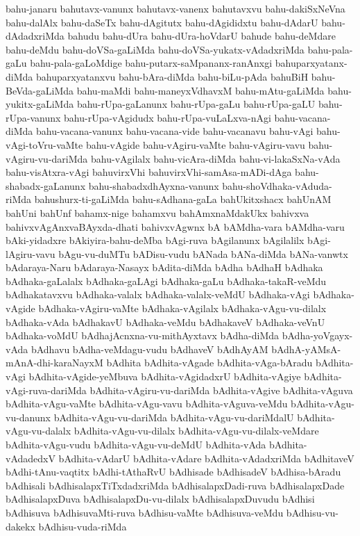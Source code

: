 {bahu-janaru
bahutavx-vanunx
bahutavx-vanenx
bahutavxvu
bahu-dakiSxNeVna
bahu-dalAlx
bahu-daSeTx
bahu-dAgitutx
bahu-dAgididxtu
bahu-dAdarU
bahu-dAdadxriMda
bahudu
bahu-dUra
bahu-dUra-hoVdarU
bahude
bahu-deMdare
bahu-deMdu
bahu-doVSa-gaLiMda
bahu-doVSa-yukatx-vAdadxriMda
bahu-pala-gaLu
bahu-pala-gaLoMdige
bahu-putarx-saMpananx-ranAnxgi
bahuparxyatanx-diMda
bahuparxyatanxvu
bahu-bAra-diMda
bahu-biLu-pAda
bahuBiH
bahu-BeVda-gaLiMda
bahu-maMdi
bahu-maneyxVdhavxM
bahu-mAtu-gaLiMda
bahu-yukitx-gaLiMda
bahu-rUpa-gaLanunx
bahu-rUpa-gaLu
bahu-rUpa-gaLU
bahu-rUpa-vanunx
bahu-rUpa-vAgidudx
bahu-rUpa-vuLaLxva-nAgi
bahu-vacana-diMda
bahu-vacana-vanunx
bahu-vacana-vide
bahu-vacanavu
bahu-vAgi
bahu-vAgi-toVru-vaMte
bahu-vAgide
bahu-vAgiru-vaMte
bahu-vAgiru-vavu
bahu-vAgiru-vu-dariMda
bahu-vAgilalx
bahu-vicAra-diMda
bahu-vi-lakaSxNa-vAda
bahu-visAtxra-vAgi
bahuvirxVhi
bahuvirxVhi-samAsa-mADi-dAga
bahu-shabadx-gaLanunx
bahu-shabadxdhAyxna-vanunx
bahu-shoVdhaka-vAduda-riMda
bahushurx-ti-gaLiMda
bahu-sAdhana-gaLa
bahUkitxshacx
bahUnAM
bahUni
bahUnf
bahamx-nige
bahamxvu
bahAmxnaMdakUkx
bahivxva
bahivxvAgAnxvaBAyxda-dhati
bahivxvAgwnx
bA
bAMdha-vara
bAMdha-varu
bAki-yidadxre
bAkiyira-bahu-deMba
bAgi-ruva
bAgilanunx
bAgilalilx
bAgi-lAgiru-vavu
bAgu-vu-duMTu
bADisu-vudu
bANada
bANa-diMda
bANa-vanwtx
bAdaraya-Naru
bAdaraya-Nasayx
bAdita-diMda
bAdha
bAdhaH
bAdhaka
bAdhaka-gaLalalx
bAdhaka-gaLAgi
bAdhaka-gaLu
bAdhaka-takaR-veMdu
bAdhakatavxvu
bAdhaka-valalx
bAdhaka-valalx-veMdU
bAdhaka-vAgi
bAdhaka-vAgide
bAdhaka-vAgiru-vaMte
bAdhaka-vAgilalx
bAdhaka-vAgu-vu-dilalx
bAdhaka-vAda
bAdhakavU
bAdhaka-veMdu
bAdhakaveV
bAdhaka-veVnU
bAdhaka-voMdU
bAdhajAcnxna-vu-mithAyxtavx
bAdha-diMda
bAdha-yoVgayx-vAda
bAdhavu
bAdha-veMdagu-vudu
bAdhaveV
bAdhAyAM
bAdhA-yAMsA-mAnA-dhi-karaNayxM
bAdhita
bAdhita-vAgade
bAdhita-vAga-bAradu
bAdhita-vAgi
bAdhita-vAgide-yeMbuva
bAdhita-vAgidadxrU
bAdhita-vAgiye
bAdhita-vAgi-ruva-dariMda
bAdhita-vAgiru-vu-dariMda
bAdhita-vAgive
bAdhita-vAguva
bAdhita-vAgu-vaMte
bAdhita-vAgu-vavu
bAdhita-vAguva-veMdu
bAdhita-vAgu-vu-danunx
bAdhita-vAgu-vu-dariMda
bAdhita-vAgu-vu-dariMdalU
bAdhita-vAgu-vu-dalalx
bAdhita-vAgu-vu-dilalx
bAdhita-vAgu-vu-dilalx-veMdare
bAdhita-vAgu-vudu
bAdhita-vAgu-vu-deMdU
bAdhita-vAda
bAdhita-vAdadedxV
bAdhita-vAdarU
bAdhita-vAdare
bAdhita-vAdadxriMda
bAdhitaveV
bAdhi-tAnu-vaqtitx
bAdhi-tAthaRvU
bAdhisade
bAdhisadeV
bAdhisa-bAradu
bAdhisali
bAdhisalapxTiTxdadxriMda
bAdhisalapxDadi-ruva
bAdhisalapxDade
bAdhisalapxDuva
bAdhisalapxDu-vu-dilalx
bAdhisalapxDuvudu
bAdhisi
bAdhisuva
bAdhisuvaMti-ruva
bAdhisu-vaMte
bAdhisuva-veMdu
bAdhisu-vu-dakekx
bAdhisu-vuda-riMda
}

